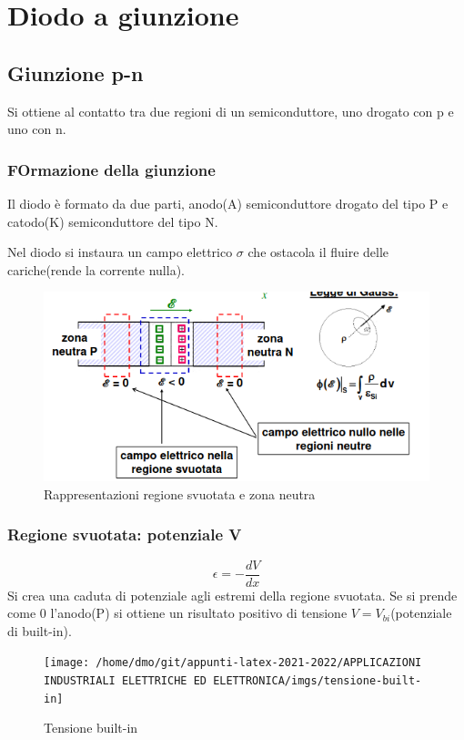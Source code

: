 \section{Diodo a giunzione}
\subsection{Giunzione p-n}

Si ottiene al contatto tra due regioni di un semiconduttore, uno drogato con p e uno con n.
\subsubsection{FOrmazione della giunzione}
Il diodo è formato da due parti, anodo(A) semiconduttore drogato del tipo P e catodo(K) semiconduttore del tipo N.

Nel diodo si instaura un campo elettrico $\sigma$ che ostacola il fluire delle cariche(rende la corrente nulla).

\begin{figure}[H]
    \centering
    \includegraphics[width=0.5\linewidth]{imgs/giunzione-svuotata}
    \caption{Rappresentazioni regione svuotata e zona neutra}
    \label{fig:reg_svuot_neutr}
\end{figure}

\subsubsection{Regione svuotata: potenziale V}
\begin{equation}
    \epsilon = -\frac{dV}{dx}
\end{equation}
Si crea una caduta di potenziale agli estremi della regione svuotata.
Se si prende come 0 l'anodo(P) si ottiene un risultato positivo di tensione $V=V_{bi}$(potenziale di built-in).

\begin{figure}[H]
    \centering
    \texttt{[image: /home/dmo/git/appunti-latex-2021-2022/APPLICAZIONI INDUSTRIALI ELETTRICHE ED ELETTRONICA/imgs/tensione-built-in]}
    \caption{Tensione built-in}
    \label{fig:built-in}
\end{figure}



